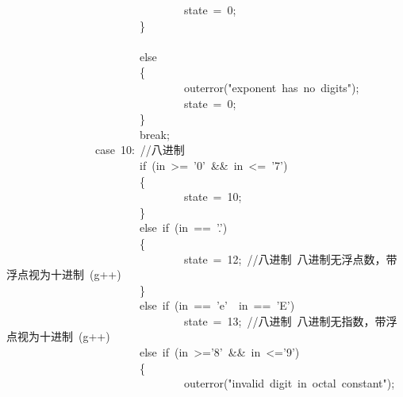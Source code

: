 \documentclass{article}
\begin{document}
\begin{mdpre}
~~~~~~~~~~~~~~~~~~~~~~~~~~~~~~~~state~=~{0};\\
~~~~~~~~~~~~~~~~~~~~~~~~\}\\
~~~~~~~~~~~~~~~~~~~~~~~~\\
~~~~~~~~~~~~~~~~~~~~~~~~{else}\\
~~~~~~~~~~~~~~~~~~~~~~~~\{\\
~~~~~~~~~~~~~~~~~~~~~~~~~~~~~~~~outerror({"}{exponent~has~no~digits}{"});\\
~~~~~~~~~~~~~~~~~~~~~~~~~~~~~~~~state~=~{0};\\
~~~~~~~~~~~~~~~~~~~~~~~~\}\\
~~~~~~~~~~~~~~~~~~~~~~~~{break};\\
~~~~~~~~~~~~~~~~{case}~{10}:~{//八进制}\\
~~~~~~~~~~~~~~~~~~~~~~~~{if}~(in~\textgreater{}=~{'0'}~\&\&~in~\textless{}=~{'7'})\\
~~~~~~~~~~~~~~~~~~~~~~~~\{\\
~~~~~~~~~~~~~~~~~~~~~~~~~~~~~~~~state~=~{10};\\
~~~~~~~~~~~~~~~~~~~~~~~~\}\\
~~~~~~~~~~~~~~~~~~~~~~~~{else}~{if}~(in~==~{'.'})\\
~~~~~~~~~~~~~~~~~~~~~~~~\{\\
~~~~~~~~~~~~~~~~~~~~~~~~~~~~~~~~state~=~{12};~{//八进制~八进制无浮点数，带浮点视为十进制~(g++)}\\
~~~~~~~~~~~~~~~~~~~~~~~~\}\\
~~~~~~~~~~~~~~~~~~~~~~~~{else}~{if}~(in~==~{'e'}~\textbar{}\textbar{}~in~==~{'E'})\\
~~~~~~~~~~~~~~~~~~~~~~~~~~~~~~~~state~=~{13};~{//八进制~八进制无指数，带浮点视为十进制~(g++)}\\
~~~~~~~~~~~~~~~~~~~~~~~~{else}~{if}~(in~\textgreater{}={'8'}~\&\&~in~\textless{}={'9'})\\
~~~~~~~~~~~~~~~~~~~~~~~~\{~~~~~~~\\
~~~~~~~~~~~~~~~~~~~~~~~~~~~~~~~~outerror({"}{invalid~digit~in~octal~constant}{"});\\

\end{mdpre}
\end{document}
